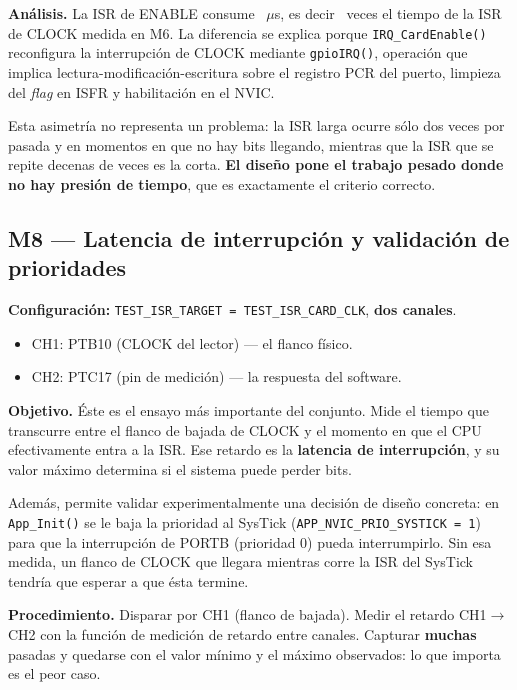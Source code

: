 \documentclass[11pt,a4paper]{article}
\newcommand{\dato}[1][2cm]{\underline{\hspace{#1}}}
\newcommand{\us}{\ensuremath{\mu}s}
\begin{document}
\textbf{Análisis.} La ISR de ENABLE consume \dato\ \us, es decir \dato\ veces
el tiempo de la ISR de CLOCK medida en M6. La diferencia se explica porque
\texttt{IRQ\_CardEnable()} reconfigura la interrupción de CLOCK mediante
\texttt{gpioIRQ()}, operación que implica lectura-modificación-escritura sobre
el registro PCR del puerto, limpieza del \textit{flag} en ISFR y habilitación
en el NVIC.

Esta asimetría no representa un problema: la ISR larga ocurre sólo dos veces
por pasada y en momentos en que no hay bits llegando, mientras que la ISR que
se repite decenas de veces es la corta. \textbf{El diseño pone el trabajo
pesado donde no hay presión de tiempo}, que es exactamente el criterio
correcto.

\subsection{M8 --- Latencia de interrupción y validación de prioridades}

\textbf{Configuración:} \texttt{TEST\_ISR\_TARGET = TEST\_ISR\_CARD\_CLK},
\textbf{dos canales}.

\begin{itemize}
  \item CH1: PTB10 (CLOCK del lector) --- el flanco físico.
  \item CH2: PTC17 (pin de medición) --- la respuesta del software.
\end{itemize}

\textbf{Objetivo.} Éste es el ensayo más importante del conjunto. Mide el
tiempo que transcurre entre el flanco de bajada de CLOCK y el momento en que
el CPU efectivamente entra a la ISR. Ese retardo es la \textbf{latencia de
interrupción}, y su valor máximo determina si el sistema puede perder bits.

Además, permite validar experimentalmente una decisión de diseño concreta: en
\texttt{App\_Init()} se le baja la prioridad al SysTick
(\texttt{APP\_NVIC\_PRIO\_SYSTICK = 1}) para que la interrupción de PORTB
(prioridad 0) pueda interrumpirlo. Sin esa medida, un flanco de CLOCK que
llegara mientras corre la ISR del SysTick tendría que esperar a que ésta
termine.

\textbf{Procedimiento.} Disparar por CH1 (flanco de bajada). Medir el retardo
CH1$\rightarrow$CH2 con la función de medición de retardo entre canales.
Capturar \textbf{muchas} pasadas y quedarse con el valor mínimo y el máximo
observados: lo que importa es el peor caso.
\end{document}
